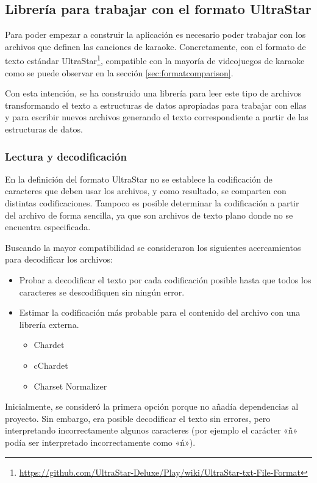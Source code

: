 \subsection{Librería para trabajar con el formato UltraStar}
\label{sec:txtparser}

Para poder empezar a construir la aplicación es necesario poder trabajar con los archivos que definen las canciones de karaoke. Concretamente, con el formato de texto estándar UltraStar\footnote{\url{https://github.com/UltraStar-Deluxe/Play/wiki/UltraStar-txt-File-Format}},  compatible con la mayoría de videojuegos de karaoke como se puede observar en la sección \ref{sec:formatcomparison}.

Con esta intención, se ha construido una librería para leer este tipo de archivos transformando el texto a estructuras de datos apropiadas para trabajar con ellas y para escribir nuevos archivos generando el texto correspondiente a partir de las estructuras de datos.

\subsubsection{Lectura y decodificación}

En la definición del formato UltraStar no se establece la codificación de caracteres que deben usar los archivos, y como resultado, se comparten con distintas codificaciones. Tampoco es posible determinar la codificación a partir del archivo de forma sencilla, ya que son archivos de texto plano donde no se encuentra especificada.

Buscando la mayor compatibilidad se consideraron los siguientes acercamientos para decodificar los archivos:

\begin{itemize}
	\item{Probar a decodificar el texto por cada codificación posible hasta que todos los caracteres se descodifiquen sin ningún error.}
	\item{Estimar la codificación más probable para el contenido del archivo con una librería externa.}
	\begin{itemize}
		\item{Chardet}
		\item{cChardet}
		\item{Charset Normalizer}
	\end{itemize}
\end{itemize}

Inicialmente, se consideró la primera opción porque no añadía dependencias al proyecto. Sin embargo, era posible decodificar el texto sin errores, pero interpretando incorrectamente algunos caracteres (por ejemplo el carácter «ñ» podía ser interpretado incorrectamente como «ń»).

